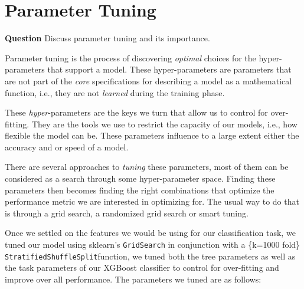 \documentclass[twoside,openright,titlepage,numbers=noenddot,headinclude,%
               footinclude=true,cleardoublepage=empty,abstractoff,BCOR=5mm,%
               paper=a4,fontsize=11pt,ngerman,american]{scrreprt}
\numberwithin{theorem}{chapter}
\numberwithin{definition}{chapter}
\numberwithin{algorithm}{chapter}
\numberwithin{figure}{chapter}
\numberwithin{table}{chapter}
\numberwithin{equation}{chapter}
\begin{document}
\section*{Parameter Tuning}

\textbf{Question} Discuss parameter tuning and its importance.

Parameter tuning is the process of discovering \emph{optimal} choices for the hyper-parameters that support a model. These hyper-parameters are parameters that are not part of the \emph{core} specifications for describing a model as a mathematical function, i.e., they are not \emph{learned} during the training phase.

These \emph{hyper}-parameters are the keys we turn that allow us to control for over-fitting. They are the tools we use to restrict the capacity of our models, i.e., how flexible the model can be. These parameters influence to a large extent either the accuracy and or speed of a model. 

There are several approaches to \emph{tuning} these parameters, most of them can be considered as a search through some hyper-parameter space. Finding these parameters then becomes finding the right combinations that optimize the performance metric we are interested in optimizing for. The usual way to do that is through a grid search, a randomized grid search or smart tuning. 



Once we settled on the features we would be using for our classification task, we tuned our model using sklearn's \texttt{GridSearch} in conjunction with a \{k=1000 fold\} \texttt{StratifiedShuffleSplit}function, we tuned both the tree parameters as well as the task parameters of our XGBoost classifier to control for over-fitting and improve over all performance. The parameters we tuned are as follows:
\end{document}
